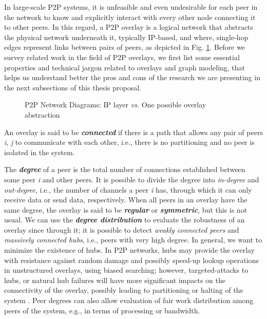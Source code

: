 \documentclass[runningheads]{llncs}
\begin{document}
In large-scale P2P systems, it is unfeasible and even undesirable for each peer in the network to know and explicitly interact with every other node connecting it to other peers. In this regard, a P2P overlay is a logical network that abstracts the physical network underneath it, typically IP-based, and where, single-hop edges represent links between pairs of peers, as depicted in Fig. \ref{fig:network_diagrams}. Before we survey related work in the field of P2P overlays, we first list some essential properties and technical jargon related to overlays and graph modeling, that helps us understand better the pros and cons of the research we are presenting in the next subsections of this thesis proposal.

\begin{figure}[ht]
    \centering
    \hspace{0.2\textwidth}
    \caption{P2P Network Diagrams: IP layer \textit{vs.} One possible overlay abstraction}
    \label{fig:network_diagrams}
\end{figure}

An overlay is said to be \textbf{\textit{connected}} if there is a path that allows any pair of peers \textit{i}, \textit{j} to communicate with each other, i.e., there is no partitioning and no peer is isolated in the system.

The \textbf{\textit{degree}} of a peer is the total number of connections established between some peer \textit{i} and other peers. It is possible to divide the degree into \textit{in-degree} and \textit{out-degree}, i.e., the number of channels a peer \textit{i} has, through which it can only receive data or send data, respectively. When all peers in an overlay have the same degree, the overlay is said to be \textbf{\textit{regular}} or \textbf{\textit{symmetric}}, but this is not usual. We can use the \textbf{\textit{degree distribution}} to evaluate the robustness of an overlay since through it; it is possible to detect \textit{weakly connected peers} and \textit{massively connected hubs}, i.e., peers with very high degree. In general, we want to minimize the existence of hubs. In P2P networks, hubs may provide the overlay with resistance against random damage and possibly speed-up lookup operations in unstructured overlays, using biased searching; however, targeted-attacks to hubs, or natural hub failures will have more significant impacts on the connectivity of the overlay, possibly leading to partitioning or halting of the system \cite{webdragons, controlling_the_hubs}. Peer degrees can also allow evaluation of fair work distribution among peers of the system, e.g., in terms of processing or bandwidth.
\end{document}
